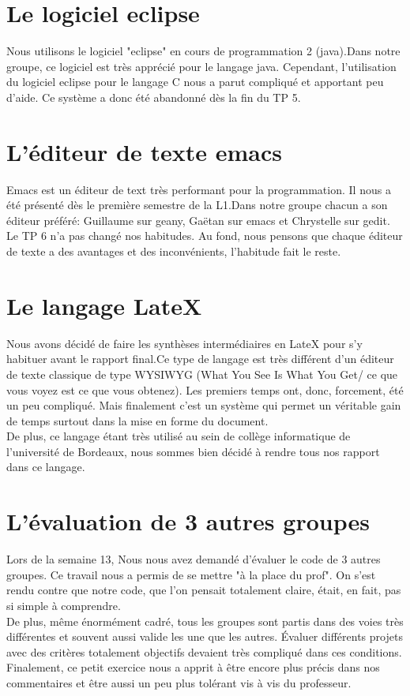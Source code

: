 \documentclass{report}
\begin{document}
\section{Le logiciel eclipse}
Nous utilisons le logiciel "eclipse" en cours de programmation 2 (java).Dans notre groupe, ce logiciel est très apprécié pour le langage java. Cependant, l'utilisation du logiciel eclipse pour le langage C nous a parut compliqué et apportant peu d'aide. Ce système a donc été abandonné dès la fin du TP 5.
\section{L'éditeur de texte emacs}
Emacs est un éditeur de text très performant pour la programmation. Il nous a été présenté dès le première semestre de la L1.Dans notre groupe chacun a son éditeur préféré: Guillaume sur geany, Gaëtan sur emacs et Chrystelle sur gedit. Le TP 6 n'a pas changé nos habitudes. Au fond, nous pensons que chaque éditeur de texte a des avantages et des inconvénients, l'habitude fait le reste.
\section{Le langage LateX}
Nous avons décidé de faire les synthèses intermédiaires en LateX pour s'y habituer avant le rapport final.Ce type de langage est très différent d'un éditeur de texte classique de type WYSIWYG (What You See Is What You Get/ ce que vous voyez est ce que vous obtenez). Les premiers temps ont, donc, forcement, été un peu compliqué. Mais finalement c'est un système qui permet un véritable gain de temps surtout dans la mise en forme du document.\\
De plus, ce langage étant très utilisé au sein de collège informatique de l'université de Bordeaux, nous sommes bien décidé à rendre tous nos rapport dans ce langage.
\section{L'évaluation de 3 autres groupes}
Lors de la semaine 13, Nous nous avez demandé d'évaluer le code de 3 autres groupes. Ce travail nous a permis de se mettre "à la place du prof". On s'est rendu contre que notre code, que l'on pensait totalement claire, était, en fait, pas si simple à comprendre.\\ De plus, même énormément cadré, tous les groupes sont partis dans des voies très différentes et souvent aussi valide les une que les autres. Évaluer différents projets avec des critères totalement objectifs devaient très compliqué dans ces conditions.\\ Finalement, ce petit exercice nous a apprit à être encore plus précis dans nos commentaires et être aussi un peu plus tolérant vis à vis du professeur.
\end{document}
